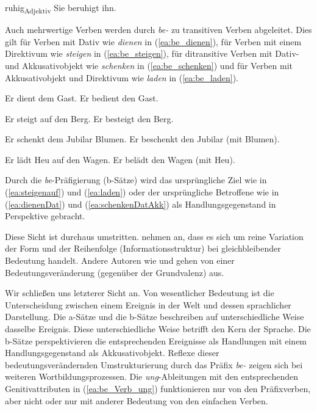 \ea \label{ea:belügen}
\label{ea:lügenitr}
\label{ex:belügenAkk}
\z 
\z 

\ea \label{ea:ruhig_beruhigen}
\ea \label{ea:ruhig} ruhig\textsubscript{Adjektiv}
\ex \label{ex:beruhigen} Sie beruhigt ihn.
\z 
\z 

Auch mehrwertige Verben werden durch \textit{be-} zu transitiven Verben abgeleitet. Dies gilt für Verben mit Dativ wie \textit{dienen} in (\ref{ea:be_dienen}), für Verben mit einem Direktivum wie \textit{steigen} in (\ref{ea:be_steigen}), für ditransitive Verben mit Dativ- und Akkusativobjekt wie \textit{schenken} in (\ref{ea:be_schenken}) und für Verben mit Akkusativobjekt und Direktivum wie \textit{laden} in (\ref{ea:be_laden}). 

\ea \label{ea:be_dienen}
\ea \label{ea:dienenDat} Er dient dem Gast.
\ex \label{ex:bedienenAkk} Er bedient den Gast.
\z 
\z 

\ea \label{ea:be_steigen}
\ea \label{ea:steigenauf} Er steigt auf den Berg.
\ex \label{ex:besteigenAkk} Er besteigt den Berg.
\z 
\z 

\ea \label{ea:be_schenken}
\ea \label{ea:schenkenDatAkk} Er schenkt dem Jubilar Blumen.
\ex \label{ex:beschenkenAkk} Er beschenkt den Jubilar (mit Blumen).
\z 
\z 

\ea \label{ea:be_laden}
\ea \label{ea:laden} Er lädt Heu auf den Wagen.
\ex \label{ex:beladen} Er belädt den Wagen (mit Heu).
\z 
\z 

Durch die \textit{be}-Präfigierung (b-Sätze) wird das ursprüngliche Ziel wie in (\ref{ea:steigenauf}) und (\ref{ea:laden}) oder der ursprüngliche Betroffene wie in (\ref{ea:dienenDat}) und (\ref{ea:schenkenDatAkk}) als Handlungsgegenstand in Perspektive gebracht. 

Diese Sicht ist durchaus umstritten. \citet[41--43]{Eroms1980} \ua nehmen an, dass es sich um reine Variation der Form und der Reihenfolge (Informationsstruktur) bei gleichbleibender Bedeutung handelt. Andere Autoren wie \citet[70--71, 189--190]{Welke1988} und \citet[268]{Eisenberg2020_Wort} gehen von einer Bedeutungsveränderung (gegenüber der Grundvalenz) aus.

Wir schließen uns letzterer Sicht an. Von wesentlicher Bedeutung ist die Unterscheidung zwischen einem Ereignis in der Welt und dessen sprachlicher Darstellung. Die a-Sätze und die b-Sätze beschreiben auf unterschiedliche Weise dasselbe Ereignis. Diese unterschiedliche Weise betrifft den Kern der Sprache. Die b-Sätze perspektivieren die entsprechenden Ereignisse als Handlungen mit einem Handlungsgegenstand als Akkusativobjekt. Reflexe dieser bedeutungsverändernden Umstrukturierung durch das Präfix \textit{be-} zeigen sich bei weiteren Wortbildungsprozessen. Die \textit{ung}-Ableitungen mit den entsprechenden Genitivattributen in (\ref{ea:be_Verb_ung}) funktionieren nur von den Präfixverben, aber nicht oder nur mit anderer Bedeutung von den einfachen Verben.

